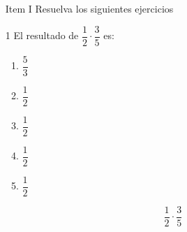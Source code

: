\documentclass[12pt]{article}
\begin{document}
	\begin{enumerate}
		\item [Item I] Resuelva los siguientes ejercicios
		\item [1] El resultado de $\dfrac{1}{2} \cdot \dfrac{3}{5}$	es: 
	\begin{enumerate}
	\item $\dfrac{5}{3}$
	\item $\dfrac{1}{2}$
	\item $\dfrac{1}{2}$
	\item $\dfrac{1}{2}$
	\item $\dfrac{1}{2}$
\end{enumerate}
		\begin{equation}
			\dfrac{1}{2} \cdot \dfrac{3}{5}
		\end{equation}
		\end{enumerate}
\end{document}
